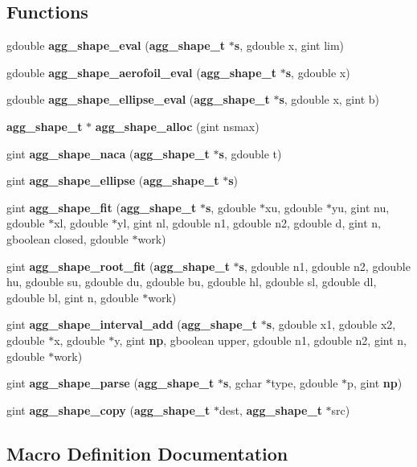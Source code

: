 \subsection*{Functions}
\begin{DoxyCompactItemize}
\item 
gdouble {\bf agg\+\_\+shape\+\_\+eval} ({\bf agg\+\_\+shape\+\_\+t} $\ast${\bf s}, gdouble x, gint lim)
\item 
gdouble {\bf agg\+\_\+shape\+\_\+aerofoil\+\_\+eval} ({\bf agg\+\_\+shape\+\_\+t} $\ast${\bf s}, gdouble x)
\item 
gdouble {\bf agg\+\_\+shape\+\_\+ellipse\+\_\+eval} ({\bf agg\+\_\+shape\+\_\+t} $\ast${\bf s}, gdouble x, gint b)
\item 
{\bf agg\+\_\+shape\+\_\+t} $\ast$ {\bf agg\+\_\+shape\+\_\+alloc} (gint nsmax)
\item 
gint {\bf agg\+\_\+shape\+\_\+naca} ({\bf agg\+\_\+shape\+\_\+t} $\ast${\bf s}, gdouble t)
\item 
gint {\bf agg\+\_\+shape\+\_\+ellipse} ({\bf agg\+\_\+shape\+\_\+t} $\ast${\bf s})
\item 
gint {\bf agg\+\_\+shape\+\_\+fit} ({\bf agg\+\_\+shape\+\_\+t} $\ast${\bf s}, gdouble $\ast$xu, gdouble $\ast$yu, gint nu, gdouble $\ast$xl, gdouble $\ast$yl, gint nl, gdouble n1, gdouble n2, gdouble d, gint n, gboolean closed, gdouble $\ast$work)
\item 
gint {\bf agg\+\_\+shape\+\_\+root\+\_\+fit} ({\bf agg\+\_\+shape\+\_\+t} $\ast${\bf s}, gdouble n1, gdouble n2, gdouble hu, gdouble su, gdouble du, gdouble bu, gdouble hl, gdouble sl, gdouble dl, gdouble bl, gint n, gdouble $\ast$work)
\item 
gint {\bf agg\+\_\+shape\+\_\+interval\+\_\+add} ({\bf agg\+\_\+shape\+\_\+t} $\ast${\bf s}, gdouble x1, gdouble x2, gdouble $\ast$x, gdouble $\ast$y, gint {\bf np}, gboolean upper, gdouble n1, gdouble n2, gint n, gdouble $\ast$work)
\item 
gint {\bf agg\+\_\+shape\+\_\+parse} ({\bf agg\+\_\+shape\+\_\+t} $\ast${\bf s}, gchar $\ast$type, gdouble $\ast$p, gint {\bf np})
\item 
gint {\bf agg\+\_\+shape\+\_\+copy} ({\bf agg\+\_\+shape\+\_\+t} $\ast$dest, {\bf agg\+\_\+shape\+\_\+t} $\ast$src)
\end{DoxyCompactItemize}


\subsection{Macro Definition Documentation}
